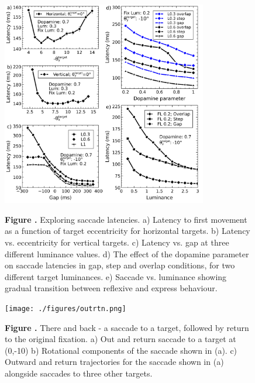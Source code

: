 \documentclass{frontiersSCNS}
\begin{document}
\begin{figure}[htb!]
\begin{center}
\includegraphics[width=0.8\textwidth]{./figures/lat_vs_everything.png}
\end{center}
\textbf{\label{lat_vs_all} Figure .}
{ Exploring saccade latencies. a) Latency to first
movement as a function of target eccentricity for horizontal targets. b) Latency
vs. eccentricity for vertical targets. c) Latency vs. gap at three different
luminance values. d) The effect of the dopamine parameter on saccade latencies
in gap, step and overlap conditions, for two different target luminances.
e) Saccade vs. luminance showing gradual transition between reflexive and
express behaviour.
}
\end{figure}

\begin{figure}[htb!]
\begin{center}
\texttt{[image: ./figures/outrtn.png]}
\end{center}
\textbf{\label{outrtn} Figure .}
{ There and back - a saccade to a target, followed by
return to
the original fixation. a) Out and return saccade to a target at (0,-10\dg)
b) Rotational components of the saccade shown in (a). c) Outward and return
trajectories for the saccade shown in (a) alongside saccades to three other
targets.}
\end{figure}
\end{document}
